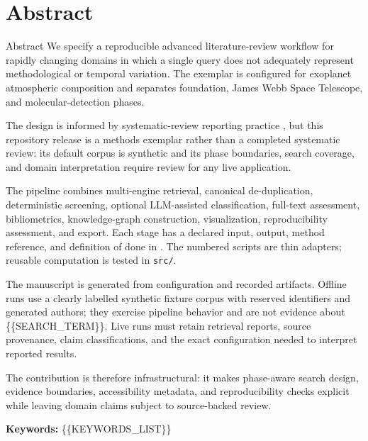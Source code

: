 \documentclass[
  ignorenonframetext,
]{beamer}
\author{}
\date{}
\begin{document}
\section{Abstract}\label{abstract}

\begin{frame}{Abstract}
We specify a reproducible advanced literature-review workflow for
rapidly changing domains in which a single query does not adequately
represent methodological or temporal variation. The exemplar is
configured for exoplanet atmospheric composition and separates
foundation, James Webb Space Telescope, and molecular-detection phases.

The design is informed by systematic-review reporting practice
, but this repository release is a methods exemplar
rather than a completed systematic review: its default corpus is
synthetic and its phase boundaries, search coverage, and domain
interpretation require review for any live application.

The pipeline combines multi-engine retrieval, canonical de-duplication,
deterministic screening, optional LLM-assisted classification, full-text
assessment, bibliometrics, knowledge-graph construction, visualization,
reproducibility assessment, and export. Each stage has a declared input,
output, method reference, and definition of done in
. The numbered scripts are thin adapters;
reusable computation is tested in \texttt{src/}.

The manuscript is generated from configuration and recorded artifacts.
Offline runs use a clearly labelled synthetic fixture corpus with
reserved identifiers and generated authors; they exercise pipeline
behavior and are not evidence about \{\{SEARCH\_TERM\}\}. Live runs must
retain retrieval reports, source provenance, claim classifications, and
the exact configuration needed to interpret reported results.

The contribution is therefore infrastructural: it makes phase-aware
search design, evidence boundaries, accessibility metadata, and
reproducibility checks explicit while leaving domain claims subject to
source-backed review.

\textbf{Keywords:} \{\{KEYWORDS\_LIST\}\}
\end{frame}
\end{document}

